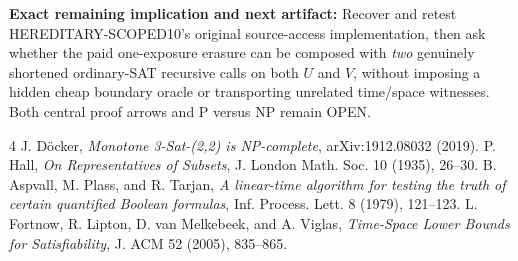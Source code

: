 \documentclass[11pt]{article}
\begin{document}
\noindent\textbf{Exact remaining implication and next artifact:} Recover and retest HEREDITARY-SCOPED10's original source-access implementation, then ask whether the paid one-exposure erasure can be composed with \emph{two} genuinely shortened ordinary-SAT recursive calls on both $U$ and $V$, without imposing a hidden cheap boundary oracle or transporting unrelated time/space witnesses. Both central proof arrows and P versus NP remain OPEN.
\begin{thebibliography}{4}
 J. D\"ocker, \emph{Monotone 3-Sat-(2,2) is NP-complete}, arXiv:1912.08032 (2019).
 P. Hall, \emph{On Representatives of Subsets}, J. London Math. Soc. 10 (1935), 26--30.
 B. Aspvall, M. Plass, and R. Tarjan, \emph{A linear-time algorithm for testing the truth of certain quantified Boolean formulas}, Inf. Process. Lett. 8 (1979), 121--123.
 L. Fortnow, R. Lipton, D. van Melkebeek, and A. Viglas, \emph{Time-Space Lower Bounds for Satisfiability}, J. ACM 52 (2005), 835--865.
\end{thebibliography}
\end{document}
